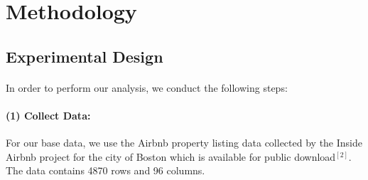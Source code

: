 \documentclass[11pt]{article}
\begin{document}
                  
    \section{Methodology}
  
 		\subsection{Experimental Design}
            \paragraph{}
            	In order to perform our analysis, we conduct the following steps:
                
             \paragraph{(1) Collect Data:}
             	For our base data, we use the Airbnb property listing data collected by the Inside Airbnb project for the city of Boston which is available for public download$^{[2]}$. The data contains 4870 rows and 96 columns.
             	
\end{document}
